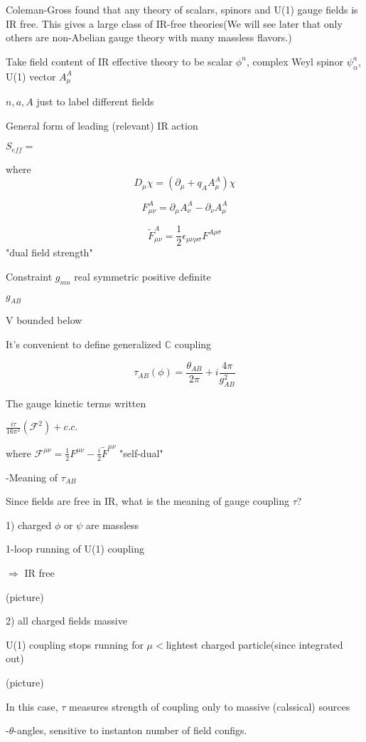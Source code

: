 \documentclass[type = bachelor]{fduthesis-en}
\begin{document}
Coleman-Gross found that any theory of scalars, spinors and U(1) gauge fields is IR free. This gives a large class of IR-free theories(We will see later that only others are non-Abelian gauge theory with many massless flavors.)

Take field content of IR effective theory to be scalar $\phi^n$, complex Weyl spinor $\psi_{\alpha}^a$, U(1) vector $A_{\mu}^A$

${n,a,A}$ just to label different fields

\bigskip General form of leading (relevant) IR action

$S_{eff}=$

where $$D_{\mu}\chi=(\partial_{\mu}+q_AA_{\mu}^A)\chi$$

$$F_{\mu\nu}^A=\partial_{\mu}A_{\nu}^A-\partial_{\nu}A_{\mu}^A$$

$$\tilde{F}_{\mu\nu}^A=\frac{1}{2}\epsilon_{\mu\nu\rho\sigma}F^{A\rho\sigma}$$ "dual field strength"

Constraint $g_{mn}$ real symmetric positive definite

$g_{AB}$

V bounded below

It's convenient to define generalized $\mathbb{C}$ coupling

$$\tau_{AB}(\phi)=\frac{\theta_{AB}}{2\pi}+i\frac{4\pi}{g_{AB}^2}$$

The gauge kinetic terms written 

$\frac{i\tau}{16\pi^2}(\mathcal{F}^2)+c.c.$

where $\mathcal{F}^{\mu\nu}=\frac{1}{2}F^{\mu\nu}-\frac{i}{2}\tilde{F}^{\mu\nu}$ "self-dual"

\bigskip
-Meaning of $\tau_{AB}$

Since fields are free in IR, what is the meaning of gauge coupling $\tau$?

1) charged $\phi$ or $\psi$ are massless

1-loop running of U(1) coupling 

$\Rightarrow$ IR free

\bigskip
(picture)

2) all charged fields massive 

U(1) coupling stops running for $\mu<$lightest charged particle(since integrated out)

\bigskip
(picture)

In this case, $\tau$ measures strength of coupling only to massive (calssical) sources

\bigskip
-$\theta$-angles, sensitive to instanton number of field configs.
\end{document}
